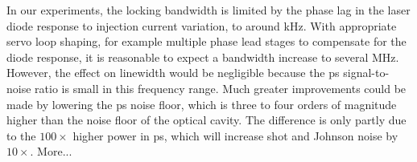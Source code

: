 In our experiments, the locking bandwidth is limited by the phase lag in the laser diode response to injection current variation, to around \unit[700]{kHz}.
With appropriate servo loop shaping, for example multiple phase lead stages to compensate for the diode response, it is reasonable to expect a bandwidth increase to several MHz.
However, the effect on linewidth would be negligible because the \gls*{ps} signal-to-noise ratio is small in this frequency range.
Much greater improvements could be made by lowering the \gls*{ps} noise floor, which is three to four orders of magnitude higher than the noise floor of the optical cavity.
The difference is only partly due to the $100\times$ higher power in \gls*{ps}, which will increase shot and Johnson noise by $10\times$.
 More...
